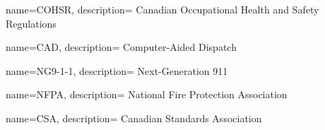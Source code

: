 {
  name={COHSR},
  description={
    Canadian Occupational Health and Safety Regulations
  }
}

{
  name={CAD},
  description={
    Computer-Aided Dispatch
  }
}

{
  name={NG9-1-1},
  description={
    Next-Generation 911
  }
}

{
  name={NFPA},
  description={
    National Fire Protection Association
  }
}

{
  name={CSA},
  description={
    Canadian Standards Association
  }
}

